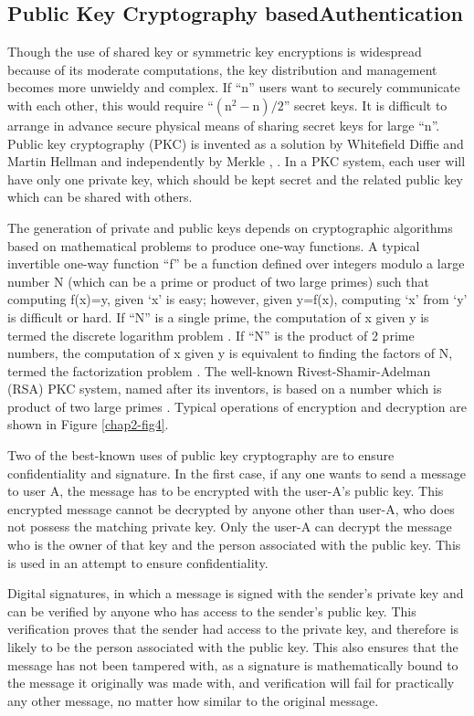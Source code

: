 \begin{multicols}{2}
\section*{Public Key Cryptography based\hfil\break Authentication}

Though the use of shared key or symmetric key encryptions is widespread because of its moderate computations, the key distribution and management becomes more unwieldy and complex. If ``n'' users want to securely communicate with each other, this would require ``$(\text{n}^{2}-\text{n})/2$'' secret keys. It is difficult to arrange in advance secure physical means of sharing secret keys for large ``n''. Public key cryptography (PKC) is invented as a solution by Whitefield Diffie and Martin Hellman and independently by Merkle \cite{chap2-key1}, \cite{chap2-key13}. In a PKC system, each user will have only one private key, which should be kept secret and the related public key which can be shared with others.

The generation of private and public keys depends on cryptographic algorithms based on mathematical problems to produce one-way functions. A typical invertible one-way function ``f'' be a function defined over integers modulo a large number N (which can be a prime or product of two large primes) such that computing f(x)=y, given `x' is easy; however, given y=f(x), computing `x' from `y' is difficult or hard. If ``N'' is a single prime, the computation of x given y is termed the discrete logarithm problem \cite{chap2-key1}. If ``N'' is the product of 2 prime numbers, the computation of x given y is equivalent to finding the factors of N, termed the factorization problem \cite{chap2-key1}. The well-known Rivest-Shamir-Adelman (RSA) PKC system, named after its inventors, is based on a number which is product of two large primes \cite{chap2-key14}. Typical operations of encryption and decryption are shown in Figure \ref{chap2-fig4}. 

Two of the best-known uses of public key cryptography are to ensure confidentiality and signature. In the first case, if any one wants to send a message to user A, the message has to be encrypted with the user-A's public key. This encrypted message cannot be decrypted by anyone other than user-A, who does not possess the matching private key. Only the user-A can decrypt the message who is the owner of that key and the person associated with the public key. This is used in an attempt to ensure confidentiality.

Digital signatures, in which a message is signed with the sender's private key and can be verified by anyone who has access to the sender's public key. This verification proves that the sender had access to the private key, and therefore is likely to be the person associated with the public key. This also ensures that the message has not been tampered with, as a signature is mathematically bound to the message it originally was made with, and verification will fail for practically any other message, no matter how similar to the original message.


\end{multicols}
